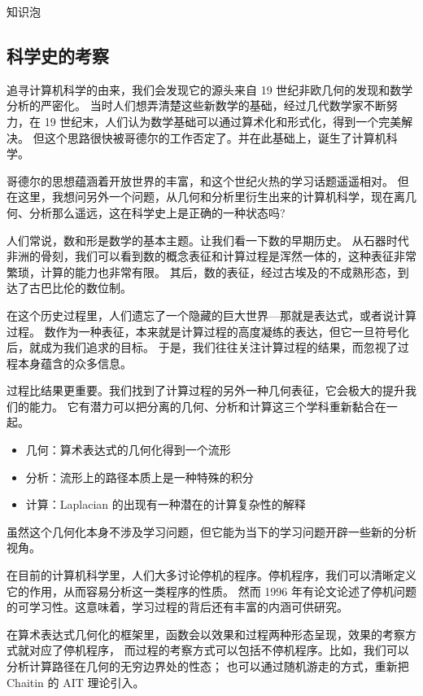 \documentclass[a4paper,12pt]{article}
\numberwithin{definition}{section}
\numberwithin{lemma}{section}
\numberwithin{proposition}{section}
\numberwithin{theorem}{section}
\numberwithin{grammar}{section}
\numberwithin{program}{section}
\numberwithin{convention}{section}
\numberwithin{corollary}{section}
\begin{document}
知识泡

\subsection{科学史的考察}

追寻计算机科学的由来，我们会发现它的源头来自 19 世纪非欧几何的发现和数学分析的严密化。
当时人们想弄清楚这些新数学的基础，经过几代数学家不断努力，在 19 世纪末，人们认为数学基础可以通过算术化和形式化，得到一个完美解决。
但这个思路很快被哥德尔的工作否定了。并在此基础上，诞生了计算机科学。

哥德尔的思想蕴涵着开放世界的丰富，和这个世纪火热的学习话题遥遥相对。
但在这里，我想问另外一个问题，从几何和分析里衍生出来的计算机科学，现在离几何、分析那么遥远，这在科学史上是正确的一种状态吗?

人们常说，数和形是数学的基本主题。让我们看一下数的早期历史。
从石器时代非洲的骨刻，我们可以看到数的概念表征和计算过程是浑然一体的，这种表征非常繁琐，计算的能力也非常有限。
其后，数的表征，经过古埃及的不成熟形态，到达了古巴比伦的数位制。

在这个历史过程里，人们遗忘了一个隐藏的巨大世界—那就是表达式，或者说计算过程。
数作为一种表征，本来就是计算过程的高度凝练的表达，但它一旦符号化后，就成为我们追求的目标。
于是，我们往往关注计算过程的结果，而忽视了过程本身蕴含的众多信息。

过程比结果更重要。我们找到了计算过程的另外一种几何表征，它会极大的提升我们的能力。
它有潜力可以把分离的几何、分析和计算这三个学科重新黏合在一起。

\begin{itemize}
    \item 几何：算术表达式的几何化得到一个流形
    \item 分析：流形上的路径本质上是一种特殊的积分
    \item 计算：Laplacian 的出现有一种潜在的计算复杂性的解释
\end{itemize}

虽然这个几何化本身不涉及学习问题，但它能为当下的学习问题开辟一些新的分析视角。

在目前的计算机科学里，人们大多讨论停机的程序。停机程序，我们可以清晰定义它的作用，从而容易分析这一类程序的性质。
然而 1996 年有论文论述了停机问题的可学习性。这意味着，学习过程的背后还有丰富的内涵可供研究。

在算术表达式几何化的框架里，函数会以效果和过程两种形态呈现，效果的考察方式就对应了停机程序，
而过程的考察方式可以包括不停机程序。比如，我们可以分析计算路径在几何的无穷边界处的性态；
也可以通过随机游走的方式，重新把 Chaitin 的 AIT 理论引入。
\end{document}
